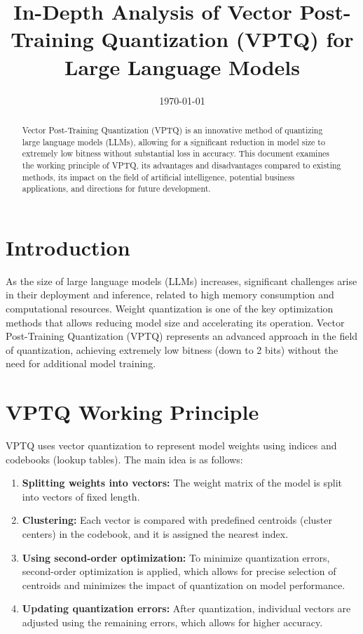 \documentclass{article}
\title{In-Depth Analysis of Vector Post-Training Quantization (VPTQ) for Large Language Models}
\date{\today}
\begin{document}
\maketitle

\begin{abstract}
Vector Post-Training Quantization (VPTQ) is an innovative method of quantizing large language models (LLMs), allowing for a significant reduction in model size to extremely low bitness without substantial loss in accuracy. This document examines the working principle of VPTQ, its advantages and disadvantages compared to existing methods, its impact on the field of artificial intelligence, potential business applications, and directions for future development.
\end{abstract}

\section{Introduction}
As the size of large language models (LLMs) increases, significant challenges arise in their deployment and inference, related to high memory consumption and computational resources. Weight quantization is one of the key optimization methods that allows reducing model size and accelerating its operation. Vector Post-Training Quantization (VPTQ) represents an advanced approach in the field of quantization, achieving extremely low bitness (down to 2 bits) without the need for additional model training.

\section{VPTQ Working Principle}
VPTQ uses vector quantization to represent model weights using indices and codebooks (lookup tables). The main idea is as follows:
\begin{enumerate}
    \item \textbf{Splitting weights into vectors:} The weight matrix of the model is split into vectors of fixed length.
    \item \textbf{Clustering:} Each vector is compared with predefined centroids (cluster centers) in the codebook, and it is assigned the nearest index.
    \item \textbf{Using second-order optimization:} To minimize quantization errors, second-order optimization is applied, which allows for precise selection of centroids and minimizes the impact of quantization on model performance.
    \item \textbf{Updating quantization errors:} After quantization, individual vectors are adjusted using the remaining errors, which allows for higher accuracy.
\end{enumerate}
\end{document}
